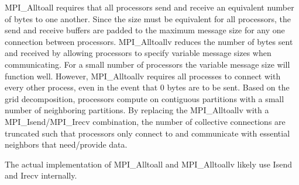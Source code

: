 \documentclass{report}
\begin{document}
MPI\_Alltoall requires that all processors send and receive an equivalent number of bytes to one another. Since the size must be equivalent for all processors, the send and receive buffers are padded to the maximum message size for any one connection between processors. MPI\_Alltoallv reduces the number of bytes sent and received by allowing processors to specify variable message sizes when communicating. For a small number of processors the variable message size will function well. However, MPI\_Alltoallv requires all processes to connect with every other process, even in the event that 0 bytes are to be sent. Based on the grid decomposition, processors compute on contiguous partitions with a small number of neighboring partitions. By replacing the MPI\_Alltoallv with a MPI\_Isend/MPI\_Irecv combination, the number of collective connections are truncated such that processors only connect to and communicate with essential neighbors that need/provide data. 

The actual implementation of MPI\_Alltoall and MPI\_Alltoallv likely use Isend and Irecv internally. 
\end{document}
